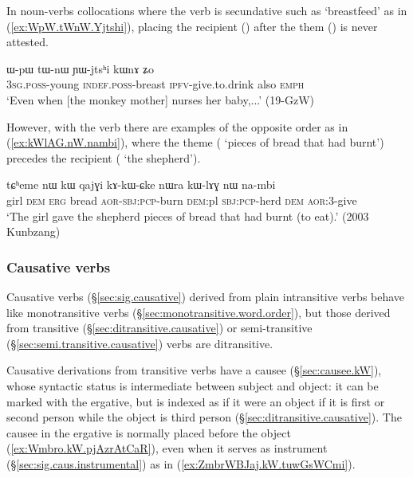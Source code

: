 In noun-verbs collocations where the verb is secundative such as  `breastfeed' as in (\ref{ex:WpW.tWnW.Yjtshi}), placing the recipient () after the them () is never attested.

\begin{exe}
\ex \label{ex:WpW.tWnW.Yjtshi}
\gll ɯ-pɯ tɯ-nɯ ɲɯ-jtsʰi kɯnɤ ʑo \\
\textsc{3sg}.\textsc{poss}-young \textsc{indef}.\textsc{poss}-breast \textsc{ipfv}-give.to.drink also \textsc{emph} \\
\glt `Even when [the monkey mother] nurses her baby,...' (19-GzW)
\end{exe}


However, with the verb  there are examples of the opposite order as in (\ref{ex:kWlAG.nW.nambi}), where the theme ( `pieces of bread that had burnt') precedes the recipient ( `the shepherd').


\begin{exe}
\ex \label{ex:kWlAG.nW.nambi}
\gll  tɕʰeme nɯ kɯ qajɣi kɤ-kɯ-ɕke nɯra kɯ-lɤɣ nɯ na-mbi \\
girl \textsc{dem} \textsc{erg} bread \textsc{aor}-\textsc{sbj}:\textsc{pcp}-burn \textsc{dem}:pl \textsc{sbj}:\textsc{pcp}-herd \textsc{dem} \textsc{aor}:3\flobv{}-give \\
\glt `The girl gave the shepherd pieces of bread that had burnt (to eat).' (2003 Kunbzang)
\end{exe}

\subsubsection{Causative verbs} \label{sec:causative.word.order}
Causative verbs (§\ref{sec:sig.causative}) derived from plain intransitive verbs behave like monotransitive verbs (§\ref{sec:monotransitive.word.order}), but those derived from transitive (§\ref{sec:ditransitive.causative}) or semi-transitive (§\ref{sec:semi.transitive.causative}) verbs are ditransitive.


Causative derivations from transitive verbs have a causee (§\ref{sec:causee.kW}), whose syntactic status is intermediate between subject and object: it can be marked with the ergative, but is indexed as if it were an object if it is first or second person while the object is third person (§\ref{sec:ditransitive.causative}). The causee in the ergative is normally placed before the object (\ref{ex:Wmbro.kW.pjAzrAtCaR}), even when it serves as instrument (§\ref{sec:sig.caus.instrumental}) as in (\ref{ex:ZmbrWBJaj.kW.tuwGsWCmi}).



